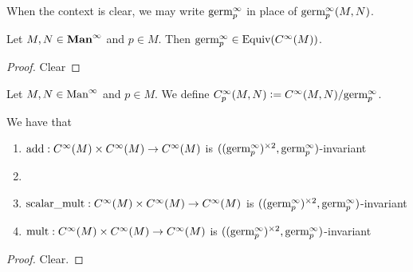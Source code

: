 \documentclass{book}
\begin{document}
\begin{note}
	When the context is clear, we may write $\text{germ}^{\infty}_p$ in place of $\text{germ}^{\infty}_p(M,N)$.
\end{note}

\begin{ex}
	Let $M, N \in \operatorname*{\text{\textbf{Man}}^{\infty}}$ and $p \in M$. Then $\text{germ}^{\infty}_p \in \operatorname*{\text{Equiv}}(C^{\infty}(M))$.
\end{ex}

\begin{proof}
	Clear 
\end{proof}

\begin{defn}
	Let $M, N \in \text{Man}^{\infty}$ and $p \in M$. We define $C^{\infty}_p(M,N) \vcentcolon= C^{\infty}(M,N)/\text{germ}^{\infty}_p$. 
\end{defn}

\begin{ex}
	We have that 
	\begin{enumerate}
		\item $\text{add}:C^{\infty}(M) \times C^{\infty}(M) \rightarrow C^{\infty}(M)$ is $((\text{germ}^{\infty}_p)^{\times 2}, \text{germ}^{\infty}_p)$-invariant
		\item \item $\text{scalar\textunderscore mult}:C^{\infty}(M) \times C^{\infty}(M) \rightarrow C^{\infty}(M)$ is $((\text{germ}^{\infty}_p)^{\times 2}, \text{germ}^{\infty}_p)$-invariant
		\item $\text{mult}:C^{\infty}(M) \times C^{\infty}(M) \rightarrow C^{\infty}(M)$ is $((\text{germ}^{\infty}_p)^{\times 2}, \text{germ}^{\infty}_p)$-invariant
	\end{enumerate}
\end{ex}

\begin{proof}
	Clear. 
\end{proof}
\end{document}
